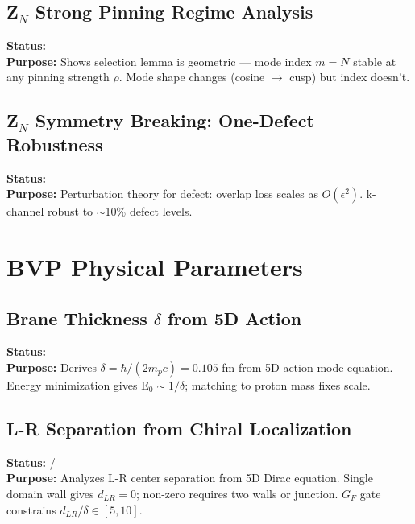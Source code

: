 

\subsection*{Z$_N$ Strong Pinning Regime Analysis}
\textbf{Status:} \tagDer{} \\
\textbf{Purpose:} Shows selection lemma is geometric --- mode index $m = N$
stable at any pinning strength $\rho$. Mode shape changes (cosine $\to$ cusp)
but index doesn't.



\subsection*{Z$_N$ Symmetry Breaking: One-Defect Robustness}
\textbf{Status:} \tagDer{} \\
\textbf{Purpose:} Perturbation theory for defect: overlap loss scales as
$O(\epsilon^2)$. k-channel robust to $\sim$10\% defect levels.



\section*{BVP Physical Parameters}

\subsection*{Brane Thickness $\delta$ from 5D Action}
\textbf{Status:} \tagDc{} \\
\textbf{Purpose:} Derives $\delta = \hbar/(2m_p c) = 0.105$ fm from 5D action
mode equation. Energy minimization gives E$_0 \sim 1/\delta$; matching to proton
mass fixes scale.



\subsection*{L-R Separation from Chiral Localization}
\textbf{Status:} \tagDc{}/\tagCal{} \\
\textbf{Purpose:} Analyzes L-R center separation from 5D Dirac equation.
Single domain wall gives $d_{LR} = 0$; non-zero requires two walls or junction.
$G_F$ gate constrains $d_{LR}/\delta \in [5,10]$.

